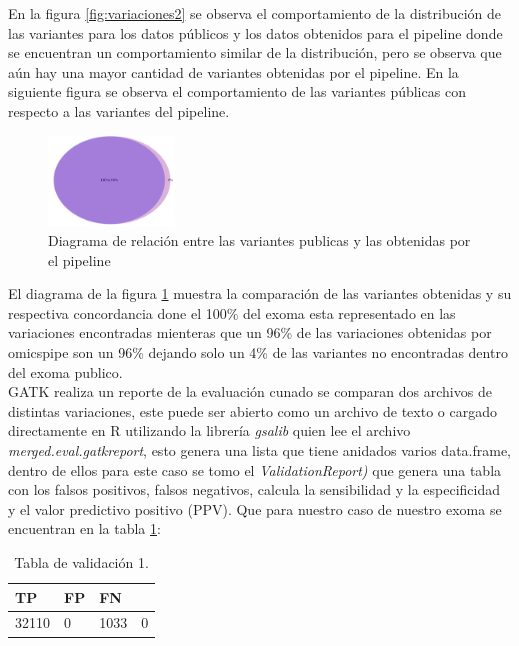 En la figura \ref{fig:variaciones2} se observa el comportamiento de la distribución de las variantes para los datos públicos y los datos obtenidos para el pipeline donde se encuentran un comportamiento similar de la distribución, pero se observa que aún hay una mayor cantidad de variantes obtenidas por el pipeline. En la siguiente figura se observa el comportamiento de las variantes públicas con respecto a las variantes del pipeline. 

\begin{figure}[H]
	\centering
	\includegraphics[width=0.3\textwidth]{Kap2/diagrama2}
	\caption{Diagrama de relación entre las variantes publicas y las obtenidas por el pipeline} \label{fig:diagrama2}
\end{figure}

El diagrama de la figura \ref{fig:diagrama2} muestra la comparación de las variantes obtenidas y su respectiva concordancia done el 100\% del exoma esta representado en las variaciones encontradas mienteras que un 96\% de las variaciones obtenidas por omicspipe son un 96\% dejando solo un 4\% de las variantes no encontradas dentro del exoma publico. \\

GATK realiza un reporte de la evaluación cunado se comparan dos archivos de distintas variaciones, este puede ser abierto como un archivo de texto o cargado directamente en R utilizando la librería \textit{gsalib} quien lee el archivo \textit{merged.eval.gatkreport}, esto genera una lista que tiene anidados varios data.frame, dentro de ellos para este caso se tomo el \textit{ValidationReport)} que genera una tabla con los falsos positivos, falsos negativos, calcula la sensibilidad y la especificidad  y el valor predictivo positivo (PPV). Que para nuestro caso de nuestro exoma se encuentran en la tabla \ref{tabla:tabla3}:

\begin{table}[H]
	\begin{center}
		\begin{tabular}{|l|l|l|l|}
			\hline 
			\textbf{TP} & \textbf{FP} & \textbf{FN} & \text{TN} \\
			\hline 
			32110 & 0 & 1033 & 0 \\ \hline
		\end{tabular}
		\caption{Tabla de validación 1.}
		\label{tabla:tabla3}
	\end{center}
\end{table}


